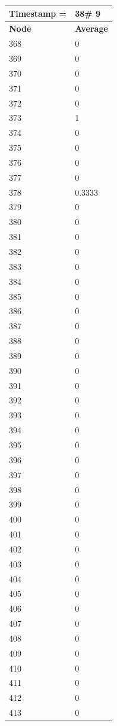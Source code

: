 \begin{tabular}{|l||l|}
\hline
\textbf{Timestamp =} & \textbf{38}\# 9\\\hline
	\textbf{Node} & \textbf{Average} \\ \hline
\hline
	368 & 0 \\ \hline
	369 & 0 \\ \hline
	370 & 0 \\ \hline
	371 & 0 \\ \hline
	372 & 0 \\ \hline
	373 & 1 \\ \hline
	374 & 0 \\ \hline
	375 & 0 \\ \hline
	376 & 0 \\ \hline
	377 & 0 \\ \hline
	378 & 0.3333 \\ \hline
	379 & 0 \\ \hline
	380 & 0 \\ \hline
	381 & 0 \\ \hline
	382 & 0 \\ \hline
	383 & 0 \\ \hline
	384 & 0 \\ \hline
	385 & 0 \\ \hline
	386 & 0 \\ \hline
	387 & 0 \\ \hline
	388 & 0 \\ \hline
	389 & 0 \\ \hline
	390 & 0 \\ \hline
	391 & 0 \\ \hline
	392 & 0 \\ \hline
	393 & 0 \\ \hline
	394 & 0 \\ \hline
	395 & 0 \\ \hline
	396 & 0 \\ \hline
	397 & 0 \\ \hline
	398 & 0 \\ \hline
	399 & 0 \\ \hline
	400 & 0 \\ \hline
	401 & 0 \\ \hline
	402 & 0 \\ \hline
	403 & 0 \\ \hline
	404 & 0 \\ \hline
	405 & 0 \\ \hline
	406 & 0 \\ \hline
	407 & 0 \\ \hline
	408 & 0 \\ \hline
	409 & 0 \\ \hline
	410 & 0 \\ \hline
	411 & 0 \\ \hline
	412 & 0 \\ \hline
	413 & 0 \\ \hline
\end{tabular}

